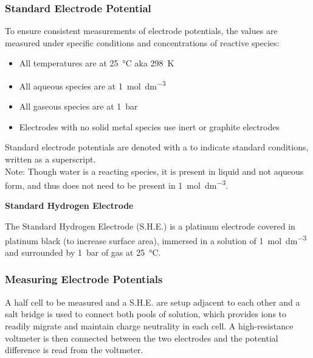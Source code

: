 \documentclass[../main]{subfiles}
\begin{document}
	\subsubsection{Standard Electrode Potential}

	To ensure consistent measurements of electrode potentials, the values are measured under specific conditions and concentrations of reactive species:

	\begin{itemize}
		\item All temperatures are at \SI{25}{\celsius} aka \SI{298}{\K}
		\item All aqueous species are at \SI{1}{\mol\per\dm\cubed}
		\item All gaseous species are at \SI{1}{\bar}
		\item Electrodes with no solid metal species use inert  or graphite electrodes
	\end{itemize}


	Standard electrode potentials are denoted with a \plimsoll to indicate standard conditions, written as a superscript. \\

	Note: Though water is a reacting species, it is present in liquid and not aqueous form, and thus does not need to be present in \SI{1}{\mol\per\dm\cubed}.

	\noindent \textbf{Standard Hydrogen Electrode}

	The Standard Hydrogen Electrode (S.H.E.) is a platinum electrode covered in platinum black (to increase surface area), immersed in a solution of \SI{1}{\mol\per\dm\cubed}  and surrounded by \SI{1}{\bar} of  gas at \SI{25}{\celsius}.

	\subsubsection{Measuring Electrode Potentials}

	A half cell to be measured and a S.H.E. are setup adjacent to each other and a salt bridge is used to connect both pools of solution, which provides ions to readily migrate and maintain charge neutrality in each cell. A high-resistance voltmeter is then connected between the two electrodes and the potential difference  is read from the voltmeter. \\
\end{document}
